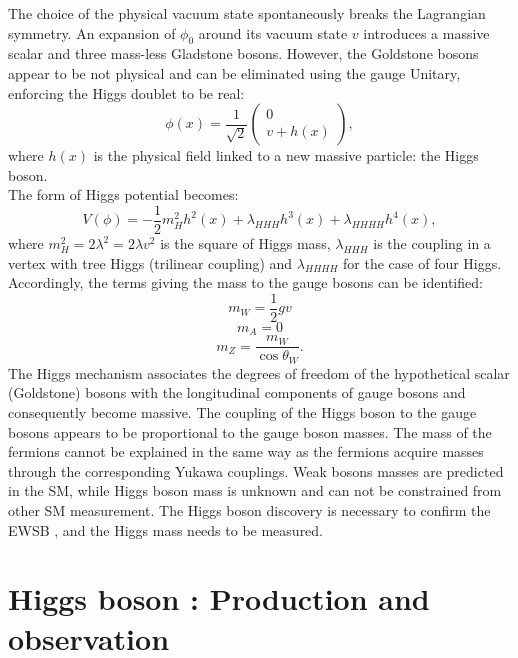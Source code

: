The choice of the physical vacuum state spontaneously breaks the Lagrangian symmetry. An expansion of $\phi_0$ around its vacuum state $v$ introduces a massive scalar and three mass-less Gladstone bosons. However, the Goldstone bosons appear to be not physical and can be eliminated using the gauge Unitary, enforcing the Higgs doublet to be real:
\begin{equation}
    \phi(x)=\frac{1}{\sqrt{2}}\left(\begin{array}{c}
0 \\
v+h(x)
\end{array}\right),
\end{equation}
where $h(x)$ is the physical field linked to a new massive particle: the Higgs boson. \\
The form of Higgs potential becomes: 
\begin{equation}
    V(\phi)=-\frac{1}{2} m_{H}^{2} h^{2}(x)+\lambda_{H H H} h^{3}(x)+\lambda_{H H H H} h^{4}(x),
\end{equation}
where $m_{H}^{2}=2 \lambda^{2}=2 \lambda v^{2}$ is the square of Higgs mass, $\lambda_{HHH}$ is the coupling in a vertex with tree Higgs (trilinear coupling) and $\lambda_{HHHH}$ for the case of four Higgs.
Accordingly, the terms giving the mass to the gauge bosons can be identified:
\begin{equation}
m_{W} = \frac{1}{2}gv 
\end{equation}
\begin{equation}
m_{A} = 0    
\end{equation}
\begin{equation}
m_{Z} = \frac{m_{W}}{\cos\theta_{W}}.
\end{equation}
The Higgs mechanism associates the degrees of freedom of the hypothetical scalar (Goldstone) bosons with the longitudinal components of gauge bosons and consequently become massive. The coupling of the Higgs boson to the gauge bosons appears to be proportional to the gauge boson masses. The mass of the fermions cannot be explained in the same way as the fermions acquire masses through the corresponding Yukawa couplings. Weak bosons masses are predicted in the SM, while Higgs boson mass is unknown and can not be constrained from other SM measurement. The Higgs boson discovery is necessary to confirm the EWSB \cite{EWSB}, and the Higgs mass needs to be measured.

\section{Higgs boson : Production and observation}
\label{chap1:H2012}

